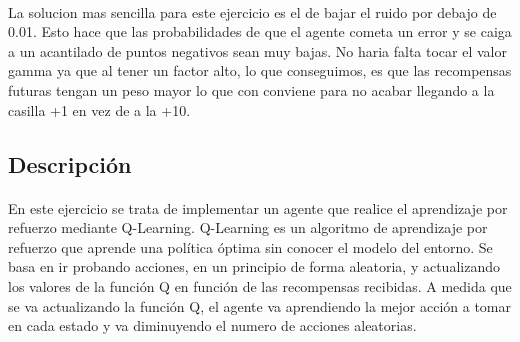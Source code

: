 \documentclass{report}
\begin{document}
        \paragraph*{}{
          La solucion mas sencilla para este ejercicio es el de bajar el ruido por debajo de 0.01.
          Esto hace que las probabilidades de que el agente cometa un error y se caiga a un acantilado de puntos negativos sean muy bajas.
          No haria falta tocar el valor gamma ya que al tener un factor alto, lo que conseguimos, es que las recompensas futuras tengan un peso mayor lo que con conviene para no acabar llegando a la casilla +1 en vez de a la +10.
        }
      \subsection*{Descripción}
        \paragraph*{}
        {
          En este ejercicio se trata de implementar un agente que realice el aprendizaje por refuerzo mediante Q-Learning.
          Q-Learning es un algoritmo de aprendizaje por refuerzo que aprende una política óptima sin conocer el modelo del entorno.
          Se basa en ir probando acciones, en un principio de forma aleatoria, y actualizando los valores de la función Q en función de las recompensas recibidas.
          A medida que se va actualizando la función Q, el agente va aprendiendo la mejor acción a tomar en cada estado y va diminuyendo el numero de acciones aleatorias.
        }
\end{document}
